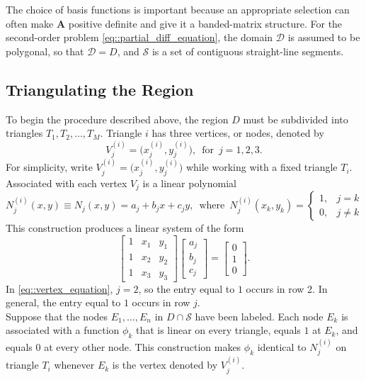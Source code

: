 \documentclass[a4paper]{article}
\begin{document}
The choice of basis functions is important because an appropriate selection can often make $\mathbf{A}$ positive definite and give it a banded-matrix structure. For the second-order problem \ref{eq::partial_diff_equation}, the domain $\mathcal{D}$ is assumed to be polygonal, so that $\mathcal{D}=D$, and $\mathcal{S}$ is a set of contiguous straight-line segments.

\subsection{Triangulating the Region}
To begin the procedure described above, the region $D$ must be subdivided into triangles $T_1,T_2,\hdots,T_M$. Triangle $i$ has three vertices, or nodes, denoted by
\begin{equation}\label{eq::triangle_vertex}
V_j^{(i)}=\big( x_j^{(i)},y_j^{(i)} \big),\,\,\, \text{for }\, j=1,2,3.
\end{equation}
For simplicity, write $V_j^{(i)}=\big(x_j^{(i)},y_j^{(i)}\big)$ while working with a fixed triangle $T_i$. Associated with each vertex $V_j$ is a linear polynomial
\begin{equation}
N_j^{(i)}(x,y)\equiv N_j(x,y)=a_j+b_jx+c_jy,\,\,\,\text{where }\, N_j^{(i)}(x_k,y_k)=
\begin{cases}
1, & j=k\\
0, & j\neq k
\end{cases}
\end{equation}
This construction produces a linear system of the form
\begin{equation}\label{eq::vertex_equation}
\begin{bmatrix}
1 & x_1 & y_1\\
1 & x_2 & y_2\\
1 & x_3 & y_3
\end{bmatrix}
\begin{bmatrix}
a_j\\
b_j\\
c_j
\end{bmatrix}=
\begin{bmatrix}
0\\
1\\
0
\end{bmatrix}.
\end{equation}
In \ref{eq::vertex_equation}, $j=2$, so the entry equal to $1$ occurs in row 2. In general, the entry equal to $1$ occurs in row $j$.\\

Suppose that the nodes $E_1,\hdots,E_n$ in $D\cap\mathcal{S}$ have been labeled. Each node $E_k$ is associated with a function $\phi_k$ that is linear on every triangle, equals $1$ at $E_k$, and equals $0$ at every other node. This construction makes $\phi_k$ identical to $N_j^{(i)}$ on triangle $T_i$ whenever $E_k$ is the vertex denoted by $V_j^{(i)}$.
\end{document}
